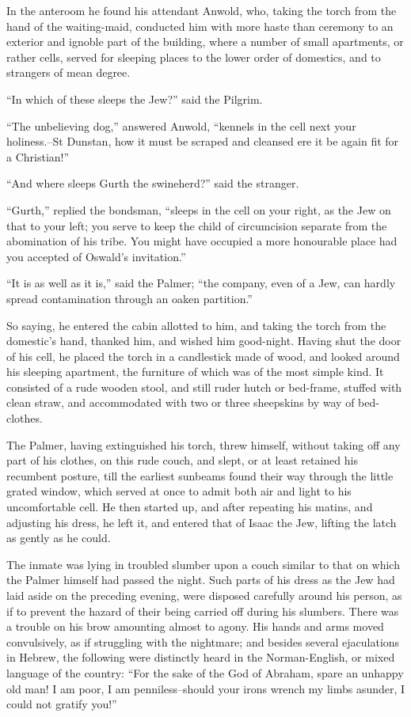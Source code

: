 In the anteroom he found his attendant Anwold, who, taking the torch
from the hand of the waiting-maid, conducted him with more haste than
ceremony to an exterior and ignoble part of the building, where a number
of small apartments, or rather cells, served for sleeping places to the
lower order of domestics, and to strangers of mean degree.

``In which of these sleeps the Jew?'' said the Pilgrim.

``The unbelieving dog,'' answered Anwold, ``kennels in the cell next
your holiness.--St Dunstan, how it must be scraped and cleansed ere it
be again fit for a Christian!''

``And where sleeps Gurth the swineherd?'' said the stranger.

``Gurth,'' replied the bondsman, ``sleeps in the cell on your right, as
the Jew on that to your left; you serve to keep the child of
circumcision separate from the abomination of his tribe. You might have
occupied a more honourable place had you accepted of Oswald's
invitation.''

``It is as well as it is,'' said the Palmer; ``the company, even of a
Jew, can hardly spread contamination through an oaken partition.''

So saying, he entered the cabin allotted to him, and taking the torch
from the domestic's hand, thanked him, and wished him good-night. Having
shut the door of his cell, he placed the torch in a candlestick made of
wood, and looked around his sleeping apartment, the furniture of which
was of the most simple kind. It consisted of a rude wooden stool, and
still ruder hutch or bed-frame, stuffed with clean straw, and
accommodated with two or three sheepskins by way of bed-clothes.

The Palmer, having extinguished his torch, threw himself, without taking
off any part of his clothes, on this rude couch, and slept, or at least
retained his recumbent posture, till the earliest sunbeams found their
way through the little grated window, which served at once to admit both
air and light to his uncomfortable cell. He then started up, and after
repeating his matins, and adjusting his dress, he left it, and entered
that of Isaac the Jew, lifting the latch as gently as he could.

The inmate was lying in troubled slumber upon a couch similar to that on
which the Palmer himself had passed the night. Such parts of his dress
as the Jew had laid aside on the preceding evening, were disposed
carefully around his person, as if to prevent the hazard of their being
carried off during his slumbers. There was a trouble on his brow
amounting almost to agony. His hands and arms moved convulsively, as if
struggling with the nightmare; and besides several ejaculations in
Hebrew, the following were distinctly heard in the Norman-English, or
mixed language of the country: ``For the sake of the God of Abraham,
spare an unhappy old man! I am poor, I am penniless--should your irons
wrench my limbs asunder, I could not gratify you!''


